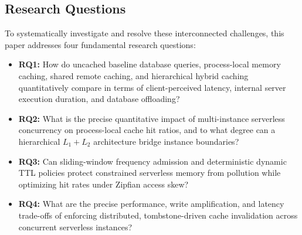 \documentclass[conference]{IEEEtran}
\begin{document}
\subsection{Research Questions}
To systematically investigate and resolve these interconnected challenges, this paper addresses four fundamental research questions:
\begin{itemize}
    \item \textbf{RQ1:} How do uncached baseline database queries, process-local memory caching, shared remote caching, and hierarchical hybrid caching quantitatively compare in terms of client-perceived latency, internal server execution duration, and database offloading?
    \item \textbf{RQ2:} What is the precise quantitative impact of multi-instance serverless concurrency on process-local cache hit ratios, and to what degree can a hierarchical $L_1 + L_2$ architecture bridge instance boundaries?
    \item \textbf{RQ3:} Can sliding-window frequency admission and deterministic dynamic TTL policies protect constrained serverless memory from pollution while optimizing hit rates under Zipfian access skew?
    \item \textbf{RQ4:} What are the precise performance, write amplification, and latency trade-offs of enforcing distributed, tombstone-driven cache invalidation across concurrent serverless instances?
\end{itemize}
\end{document}
